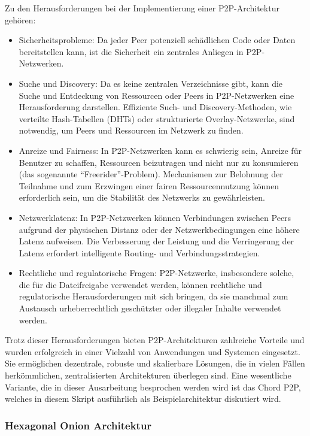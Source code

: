 Zu den Herausforderungen bei der Implementierung einer P2P-Architektur gehören:
\begin{itemize}
\item Sicherheitsprobleme: Da jeder Peer potenziell schädlichen Code oder Daten bereitstellen kann, ist die Sicherheit ein zentrales Anliegen in P2P-Netzwerken.
\item Suche und Discovery: Da es keine zentralen Verzeichnisse gibt, kann die Suche und Entdeckung von Ressourcen oder Peers in P2P-Netzwerken eine Herausforderung darstellen. Effiziente Such- und Discovery-Methoden, wie verteilte Hash-Tabellen (DHTs) oder strukturierte Overlay-Netzwerke, sind notwendig, um Peers und Ressourcen im Netzwerk zu finden.
\item Anreize und Fairness: In P2P-Netzwerken kann es schwierig sein, Anreize für Benutzer zu schaffen, Ressourcen beizutragen und nicht nur zu konsumieren (das sogenannte \enquote{Freerider}-Problem). Mechanismen zur Belohnung der Teilnahme und zum Erzwingen einer fairen Ressourcennutzung können erforderlich sein, um die Stabilität des Netzwerks zu gewährleisten.
\item Netzwerklatenz: In P2P-Netzwerken können Verbindungen zwischen Peers aufgrund der physischen Distanz oder der Netzwerkbedingungen eine höhere Latenz aufweisen. Die Verbesserung der Leistung und die Verringerung der Latenz erfordert intelligente Routing- und Verbindungsstrategien.
\item Rechtliche und regulatorische Fragen: P2P-Netzwerke, insbesondere solche, die für die Dateifreigabe verwendet werden, können rechtliche und regulatorische Herausforderungen mit sich bringen, da sie manchmal zum Austausch urheberrechtlich geschützter oder illegaler Inhalte verwendet werden.   
\end{itemize}
Trotz dieser Herausforderungen bieten P2P-Architekturen zahlreiche Vorteile und wurden erfolgreich in einer Vielzahl von Anwendungen und Systemen eingesetzt. Sie ermöglichen dezentrale, robuste und skalierbare Lösungen, die in vielen Fällen herkömmlichen, zentralisierten Architekturen überlegen sind. Eine wesentliche Variante, die in dieser Ausarbeitung besprochen werden wird ist das Chord P2P, welches in diesem Skript ausführlich als Beispielarchitektur diskutiert wird. 

\subsubsection{Hexagonal Onion Architektur}


